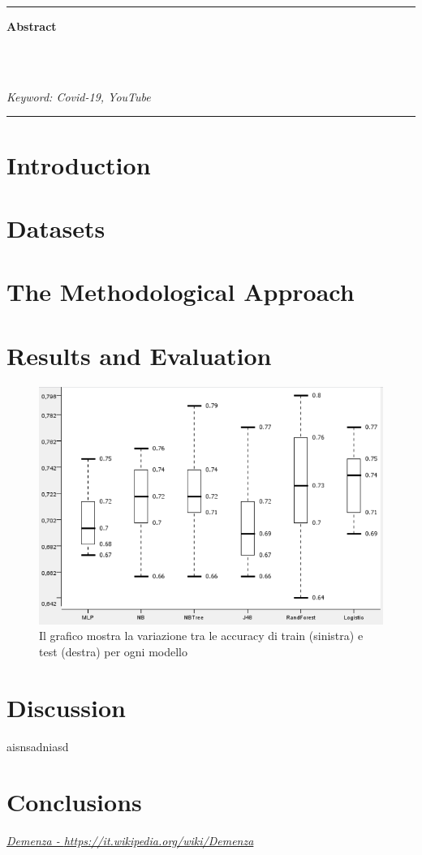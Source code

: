 \documentclass[10pt, a4paper,openany]{article}
\begin{document}
\hrule
\vspace{0.2cm}
\begin{center}\textbf{Abstract}\end{center} 
\blindtext[1]
\\\\ \begin{small}
	\textit{Keyword: Covid-19, YouTube}
\end{small}
\vspace{0.2cm}
\hrule
\vspace{0.2cm}

\begin{multicols}{2}
	\section{Introduction}
	\blindtext[1]
	\section{Datasets}
	\blindtext[1]
	\section{The Methodological Approach}
	\blindtext[1]
	\section{Results and Evaluation}
	\blindtext[1]
	\begin{figure}[H]
		\centering
		\includegraphics[height=0.6 \linewidth]{pics/IterHold.png}
		\caption{Il grafico mostra la variazione tra le accuracy di train (sinistra) e test (destra) per ogni modello}
		\label{fig:trainHold}
	\end{figure}	
	\section{Discussion}
	\blindtext[1]
	aisnsadniasd \cite{a:tesi}
	\section{Conclusions}
	
	\blindtext[1]
	
\end{multicols}

\newpage
\begin{thebibliography}{1}

	\href{https://it.wikipedia.org/wiki/Demenza}{\emph{Demenza - \url{https://it.wikipedia.org/wiki/Demenza}}}
	
\end{thebibliography}
\end{document}
